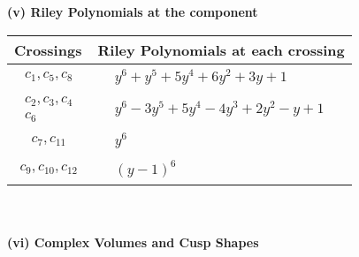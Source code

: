 \documentclass[1p]{elsarticle_modified}
\theoremstyle{definition}
\begin{document}
\newpage\renewcommand{\arraystretch}{1}
\flushleft \textbf{(v) Riley Polynomials at the component}\newline \\
\begin{tabular}{m{50pt}|m{274pt}}
Crossings & \hspace{64pt}Riley Polynomials at each crossing \\
\hline $$\begin{aligned}c_{1},c_{5},c_{8}\end{aligned}$$&$\begin{aligned}
&y^6+y^5+5 y^4+6 y^2+3 y+1
\end{aligned}$\\
\hline $$\begin{aligned}c_{2},c_{3},c_{4}\\c_{6}\end{aligned}$$&$\begin{aligned}
&y^6-3 y^5+5 y^4-4 y^3+2 y^2- y+1
\end{aligned}$\\
\hline $$\begin{aligned}c_{7},c_{11}\end{aligned}$$&$\begin{aligned}
&y^6
\end{aligned}$\\
\hline $$\begin{aligned}c_{9},c_{10},c_{12}\end{aligned}$$&$\begin{aligned}
&(y-1)^6
\end{aligned}$\\
\hline
\end{tabular}\\~\\
\newpage\flushleft \textbf{(vi) Complex Volumes and Cusp Shapes}
\end{document}

